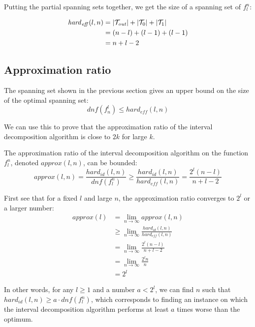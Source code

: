 Putting the partial spanning sets together,
we get the size of a spanning set of $f_l^n$:

\begin{align*}
\mathit{hard}_{\mathit{eff}}(l,n)
&= \lvert\mathcal{T}_{\mathit{out}}\rvert
+ \lvert\mathcal{T}_0\rvert + \lvert\mathcal{T}_1\rvert \\
&= (n-l) + (l-1) + (l-1) \\
&= n + l - 2
\end{align*}

\subsection{Approximation ratio}

The spanning set shown in the previous section
gives an upper bound on the size
of the optimal spanning set:
$$
\mathit{dnf}(f^l_n)
\leq \mathit{hard}_{\mathit{eff}}(l,n)
$$

We can use this to prove that the approximation ratio
of the interval decomposition algorithm is close to $2k$
for large $k$.

The approximation ratio
of the interval decomposition algorithm
on the function $f_l^n$,
denoted $\mathit{approx}(l,n)$,
can be bounded:
$$
\mathit{approx}(l,n)
= \frac{\mathit{hard}_{id}(l,n)}{\mathit{dnf}(f_l^n)}
\geq \frac{\mathit{hard}_{id}(l,n)}
{\mathit{hard}_{\mathit{eff}}(l,n)}
= \frac{2^l(n-l)}{n+l-2}
$$

First see that for a fixed $l$ and large $n$,
the approximation ratio converges to $2^l$
or a larger number:
\begin{align*}
\mathit{approx}(l)
&= \lim_{n \rightarrow \infty}{\mathit{approx}(l,n)} \\
&\geq \lim_{n \rightarrow \infty}
{\frac{\mathit{hard}_{\mathit{id}}(l,n)}
{\mathit{hard}_{\mathit{eff}}(l,n)}} \\
&= \lim_{n \rightarrow \infty}{\frac{2^l(n-l)}{n+l-2}} \\
&= \lim_{n \rightarrow \infty}{\frac{2^l n}{n}} \\
&= 2^l
\end{align*}

In other words,
for any $l \geq 1$ and a number $a < 2^l$,
we can find $n$ such that
$\mathit{hard}_{\mathit{id}}(l,n)
\geq a \cdot \mathit{dnf}(f_l^n)$,
which corresponds to finding an instance
on which the interval decomposition algorithm performs
at least $a$ times worse than the optimum.

